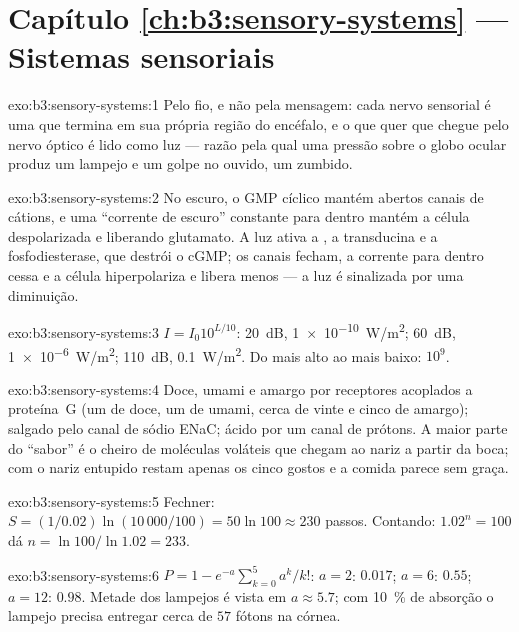 \section*{Capítulo \ref{ch:b3:sensory-systems} --- Sistemas sensoriais}

\begin{solution}{exo:b3:sensory-systems:1}
Pelo fio, e não pela mensagem: cada nervo sensorial é uma 
que termina em sua própria região do encéfalo, e o que quer que chegue
pelo nervo óptico é lido como luz --- razão pela qual uma pressão sobre
o globo ocular produz um lampejo e um golpe no ouvido, um zumbido.
\end{solution}

\begin{solution}{exo:b3:sensory-systems:2}
No escuro, o GMP cíclico mantém abertos canais de cátions, e uma
``corrente de escuro'' constante para dentro mantém a célula
despolarizada e liberando glutamato. A luz ativa a , a
transducina e a fosfodiesterase, que destrói o cGMP; os canais fecham, a
corrente para dentro cessa e a célula hiperpolariza e libera menos --- a
luz é sinalizada por uma diminuição.
\end{solution}

\begin{solution}{exo:b3:sensory-systems:3}
$I = I_{0}10^{L/10}$: \qty{20}{dB}, \qty{1e-10}{W/m^2}; \qty{60}{dB},
\qty{1e-6}{W/m^2}; \qty{110}{dB}, \qty{0.1}{W/m^2}. Do mais alto ao mais
baixo: $10^{9}$.
\end{solution}

\begin{solution}{exo:b3:sensory-systems:4}
Doce, umami e amargo por receptores acoplados a proteína~G (um de doce,
um de umami, cerca de vinte e cinco de amargo); salgado pelo canal de
sódio ENaC; ácido por um canal de prótons. A maior parte do ``sabor'' é
o cheiro de moléculas voláteis que chegam ao nariz a partir da boca; com
o nariz entupido restam apenas os cinco gostos e a comida parece sem
graça.
\end{solution}

\begin{solution}{exo:b3:sensory-systems:5}
Fechner: $S = (1/0.02)\ln(10\,000/100) = 50\ln 100 \approx 230$ passos.
Contando: $1.02^{n} = 100$ dá $n = \ln 100/\ln 1.02 = 233$.
\end{solution}

\begin{solution}{exo:b3:sensory-systems:6}
$P = 1 - e^{-a}\sum_{k=0}^{5}a^{k}/k!$: $a = 2$: $0.017$; $a = 6$:
$0.55$; $a = 12$: $0.98$. Metade dos lampejos é vista em $a \approx 5.7$;
com \qty{10}{\%} de absorção o lampejo precisa entregar cerca de $57$
fótons na córnea.
\end{solution}

